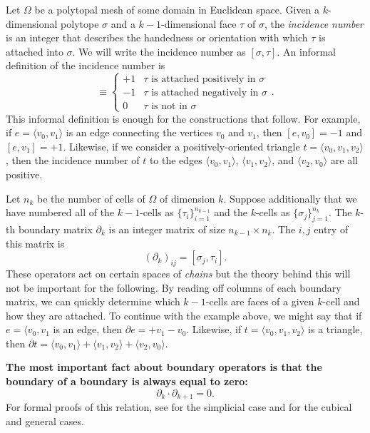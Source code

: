\documentclass[twocolumn]{article}
\begin{document}
Let $\Omega$ be a polytopal mesh of some domain in Euclidean space.
Given a $k$-dimensional polytope $\sigma$ and a $k - 1$-dimensional face $\tau$ of $\sigma$, the \emph{incidence number} is an integer that describes the handedness or orientation with which $\tau$ is attached into $\sigma$.
We will write the incidence number as $[\sigma, \tau]$.
An informal definition of the incidence number is
\begin{equation}
    [\sigma, \tau] \equiv \begin{cases} +1 & \tau\text{ is attached positively in }\sigma \\ -1 & \tau\text{ is attached negatively in }\sigma \\ 0 & \tau\text{ is not in }\sigma\end{cases}.
\end{equation}
This informal definition is enough for the constructions that follow.
For example, if $e = \langle v_0, v_1\rangle$ is an edge connecting the vertices $v_0$ and $v_1$, then $[e, v_0] = -1$ and $[e, v_1] = +1$.
Likewise, if we consider a positively-oriented triangle $t = \langle v_0, v_1, v_2\rangle$, then the incidence number of $t$ to the edges $\langle v_0, v_1\rangle$, $\langle v_1, v_2\rangle$, and $\langle v_2, v_0\rangle$ are all positive.

Let $n_k$ be the number of cells of $\Omega$ of dimension $k$.
Suppose additionally that we have numbered all of the $k - 1$-cells as $\{\tau_i\}_{i = 1}^{n_{k - 1}}$ and the $k$-cells as $\{\sigma_j\}_{j = 1}^{n_k}$.
The $k$-th boundary matrix $\partial_k$ is an integer matrix of size $n_{k - 1} \times n_k$.
The $i, j$ entry of this matrix is
\begin{equation}
    (\partial_k)_{ij} = [\sigma_j, \tau_i].
\end{equation}
These operators act on certain spaces of \emph{chains} but the theory behind this will not be important for the following.
By reading off columns of each boundary matrix, we can quickly determine which $k - 1$-cells are faces of a given $k$-cell and how they are attached.
To continue with the example above, we might say that if $e = \langle v_0, v_1$ is an edge, then $\partial e = +v_1 - v_0$.
Likewise, if $t = \langle v_0, v_1, v_2\rangle$ is a triangle, then $\partial t = \langle v_0, v_1\rangle + \langle v_1, v_2\rangle + \langle v_2, v_0\rangle$.

\textbf{The most important fact about boundary operators is that the boundary of a boundary is always equal to zero:}
\begin{equation}
    \partial_k\cdot\partial_{k + 1} = 0.
    \label{eq:ddzero}
\end{equation}
For formal proofs of this relation, see \cite{hatcher2002algebraic} for the simplicial case and \cite{massey2019basic} for the cubical and general cases.
\end{document}
